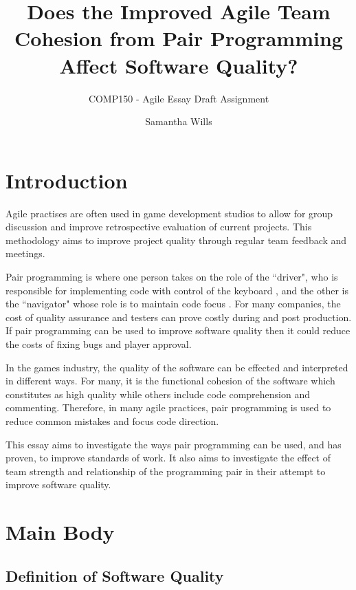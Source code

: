 \documentclass{scrartcl}
\title{Does the Improved Agile Team Cohesion from Pair Programming Affect Software Quality?}
\subtitle{COMP150 - Agile Essay Draft Assignment}
\author{Samantha Wills}
\begin{document}
\maketitle
{}

\section*{Introduction}
Agile practises are often used in game development studios to allow for group discussion and improve retrospective evaluation of current projects. This methodology aims to improve project quality through regular team feedback and meetings.

Pair programming is where one person takes on the role of the ``driver", who is responsible for implementing code with control of the keyboard \cite{Hofer:2008}, and the other is the ``navigator" whose role is to maintain code focus \cite{Hulkko:2005}. For many companies, the cost of quality assurance and testers can prove costly during and post production. If pair programming can be used to improve software quality then it could reduce the costs of fixing bugs and player approval.

In the games industry, the quality of the software can be effected and interpreted in different ways. For many, it is the functional cohesion of the software which constitutes as high quality while others include code comprehension and commenting. Therefore, in many agile practices, pair programming is used to reduce common mistakes and focus code direction.

This essay aims to investigate the ways pair programming can be used, and has proven, to improve standards of work. It also aims to investigate the effect of team strength and relationship of the programming pair in their attempt to improve software quality.

\section{Main Body}
\subsection{Definition of Software Quality}
\end{document}
